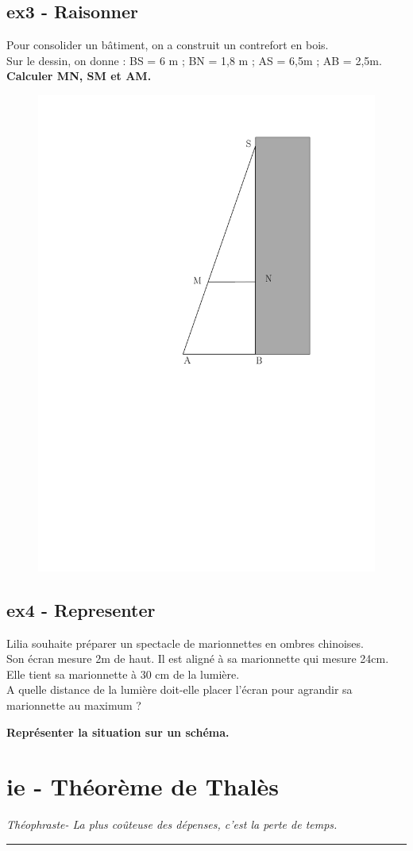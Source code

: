 \documentclass[12pt]{article}
\newcommand{\horrule}[1]{\rule{\linewidth}{#1}} %
\begin{document}
\begin{multicols}{3}
  \subsection*{ex3 - Raisonner}
  Pour consolider un bâtiment, on a construit un contrefort en bois. \\
  Sur le dessin, on donne : BS = 6 m ; BN = 1,8 m ; AS = 6,5m ; AB = 2,5m.\\
  \textbf{Calculer MN, SM et AM.}
  \begin{figure}[H]
    \centering
    \includegraphics[width=.5\linewidth]{4x6-thales/sources/mur.pdf}
  \end{figure}


  \subsection*{ex4 - Representer}
  Lilia souhaite préparer un spectacle de marionnettes en ombres chinoises. \\
  Son écran mesure 2m de haut. Il est aligné à sa marionnette qui mesure 24cm.
  Elle tient sa marionnette à 30 cm de la lumière.\\
  A quelle distance de la lumière doit-elle placer l’écran pour agrandir sa marionnette au maximum ?

  \textbf{Représenter la situation sur un schéma.}
\end{multicols}

\newpage

\section*{ie - Théorème de Thalès}
\begin{center}
  \textit{Théophraste- La plus coûteuse des dépenses, c’est la perte de temps.}
\end{center}
\horrule{2px}
\end{document}
